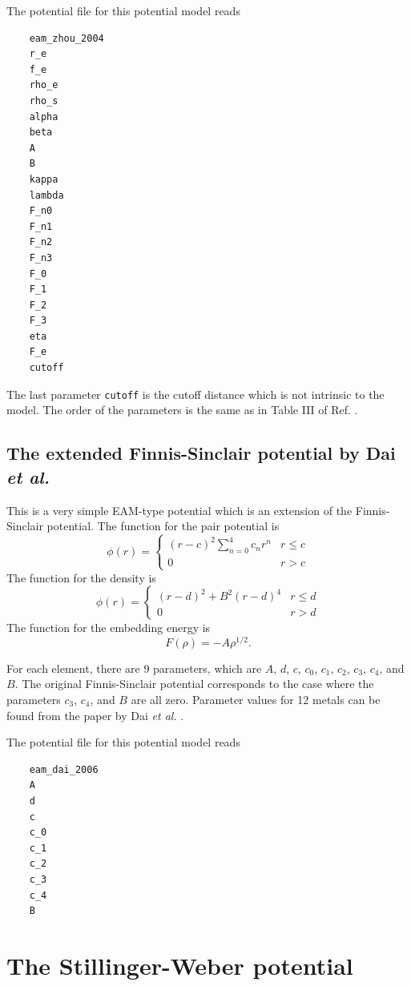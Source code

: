 \documentclass[12pt,a4paper]{report}
\begin{document}
The potential file for this potential model reads
\begin{verbatim}
    eam_zhou_2004
    r_e
    f_e
    rho_e
    rho_s
    alpha
    beta
    A
    B
    kappa
    lambda
    F_n0
    F_n1
    F_n2
    F_n3
    F_0
    F_1
    F_2
    F_3
    eta
    F_e
    cutoff
\end{verbatim}
The last parameter \verb"cutoff" is the cutoff distance which is not intrinsic to the model. The order of the parameters is the same as in Table III of Ref. \cite{zhou2004prb}.

\subsection{The extended Finnis-Sinclair potential by Dai \textit{et al.}}

This is a very simple EAM-type potential which is an extension of the Finnis-Sinclair potential. The function for the pair potential is
\begin{equation}
\phi(r) =
\begin{cases}
(r-c)^2 \sum_{n=0}^4 c_n r^n  & r \leq c \\
0                             & r > c
\end{cases}
\end{equation}
The function for the density is
\begin{equation}
\phi(r) =
\begin{cases}
(r-d)^2 + B^2 (r-d)^4  & r \leq d \\
0                      & r > d
\end{cases}
\end{equation}
The function for the embedding energy is
\begin{equation}
F(\rho) = - A \rho^{1/2}.
\end{equation}

For each element, there are 9 parameters, which are $A$, $d$, $c$, $c_0$, $c_1$, $c_2$, $c_3$, $c_4$, and $B$. The original Finnis-Sinclair potential corresponds to the case where the parameters $c_3$, $c_4$, and $B$ are all zero. Parameter values for 12 metals can be found from the paper by Dai \textit{et al.} \cite{dai2006jpcm}.


The potential file for this potential model reads
\begin{verbatim}
    eam_dai_2006
    A
    d
    c
    c_0
    c_1
    c_2
    c_3
    c_4
    B
\end{verbatim}


\section{The Stillinger-Weber potential}
\end{document}
